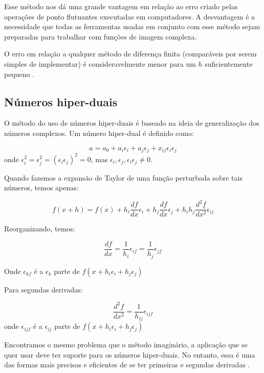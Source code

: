 Esse método nos dá uma grande vantagem em relação ao erro criado pelas operações de ponto flutuantes
executadas em computadores. A desvantagem é a necessidade que todas as ferramentas usadas em
conjunto com esse método sejam preparadas para trabalhar com funções de imagem complexa.

O erro em relação a qualquer método de diferença finita (comparáveis por serem simples de implementar)
é consideravelmente menor para um \(h\) suficientemente pequeno \cite{caplan2011numerical}.

\subsection{Números hiper-duais}
\label{sec_hiper_dual}
O método do uso de números hiper-duais \cite{Fike_2011} é baseado na ideia de generalização dos números complexos.
Um número hiper-dual é definido como:

\begin{equation}
a = a_0 + a_i\epsilon_i + a_j\epsilon_j + x_{ij}\epsilon_i \epsilon_j
\end{equation}
onde \(\epsilon_i^2 = \epsilon_j^2 = (\epsilon_i\epsilon_j)^2 = 0\), mas \( \epsilon_i, \epsilon_j, \epsilon_i\epsilon_j  \neq 0\).

Quando fazemos a expansão de Taylor de uma função perturbada sobre tais números, temos apenas:

\begin{equation}
f(x+ h) = f(x) + h_i \frac{df}{dx} \epsilon_i + h_j \frac{df}{dx} \epsilon_j +    h_ih_j \frac{d^2f}{dx^2} \epsilon_{ij}
\end{equation}

Reorganizando, temos:

\begin{equation}
  \frac{df}{dx} = \frac{1}{h_i} \epsilon_{if} = \frac{1}{h_j} \epsilon_{jf}
\end{equation}


Onde \(\epsilon_{kf}\) é a \(\epsilon_k\) parte de \( f(x + h_i\epsilon_i + h_j\epsilon_j) \)

Para segundas derivadas:

\begin{equation}
\frac{d^2f}{dx^2} = \frac{1}{h_{ij}} \epsilon_{ijf}
\end{equation}
onde \(\epsilon_{ijf}\) é a \(\epsilon_{ij}\) parte de \( f(x + h_i\epsilon_i + h_j\epsilon_j) \)

Encontramos o mesmo problema que o método imaginário, a aplicação que se quer usar deve ter
suporte para os números hiper-duais. No entanto, essa é uma das formas mais precisas e
eficientes de se ter primeiras e segundas derivadas \cite{Fike_2011}.